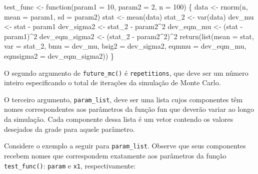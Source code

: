 \documentclass[
  letterpaper,
  DIV=11,
  numbers=noendperiod]{scrreprt}
\newenvironment{Shaded}{\begin{snugshade}}{\end{snugshade}}
\newcommand{\AttributeTok}[1]{\textcolor[rgb]{0.40,0.45,0.13}{#1}}
\newcommand{\ControlFlowTok}[1]{\textcolor[rgb]{0.00,0.23,0.31}{#1}}
\newcommand{\DecValTok}[1]{\textcolor[rgb]{0.68,0.00,0.00}{#1}}
\newcommand{\FunctionTok}[1]{\textcolor[rgb]{0.28,0.35,0.67}{#1}}
\newcommand{\NormalTok}[1]{\textcolor[rgb]{0.00,0.23,0.31}{#1}}
\newcommand{\OtherTok}[1]{\textcolor[rgb]{0.00,0.23,0.31}{#1}}
\newcommand{\SpecialCharTok}[1]{\textcolor[rgb]{0.37,0.37,0.37}{#1}}
\begin{document}
\begin{Shaded}
\begin{Highlighting}[]
\NormalTok{test\_func }\OtherTok{\textless{}{-}} \ControlFlowTok{function}\NormalTok{(}\AttributeTok{param1 =} \DecValTok{10}\NormalTok{, }\AttributeTok{param2 =} \DecValTok{2}\NormalTok{, }\AttributeTok{n =} \DecValTok{100}\NormalTok{) \{}
\NormalTok{  data }\OtherTok{\textless{}{-}} \FunctionTok{rnorm}\NormalTok{(n, }\AttributeTok{mean =}\NormalTok{ param1, }\AttributeTok{sd =}\NormalTok{ param2)}
\NormalTok{  stat }\OtherTok{\textless{}{-}} \FunctionTok{mean}\NormalTok{(data)}
\NormalTok{  stat\_2 }\OtherTok{\textless{}{-}} \FunctionTok{var}\NormalTok{(data)}
\NormalTok{  dev\_mu }\OtherTok{\textless{}{-}}\NormalTok{ stat }\SpecialCharTok{{-}}\NormalTok{ param1}
\NormalTok{  dev\_sigma2 }\OtherTok{\textless{}{-}}\NormalTok{ stat\_2 }\SpecialCharTok{{-}}\NormalTok{ param2}\SpecialCharTok{\^{}}\DecValTok{2}
\NormalTok{  dev\_eqm\_mu }\OtherTok{\textless{}{-}}\NormalTok{ (stat }\SpecialCharTok{{-}}\NormalTok{ param1)}\SpecialCharTok{\^{}}\DecValTok{2}
\NormalTok{  dev\_eqm\_sigma2 }\OtherTok{\textless{}{-}}\NormalTok{ (stat\_2 }\SpecialCharTok{{-}}\NormalTok{ param2}\SpecialCharTok{\^{}}\DecValTok{2}\NormalTok{)}\SpecialCharTok{\^{}}\DecValTok{2}
  \FunctionTok{return}\NormalTok{(}\FunctionTok{list}\NormalTok{(}\AttributeTok{mean =}\NormalTok{ stat, }\AttributeTok{var =}\NormalTok{ stat\_2, }\AttributeTok{bmu =}\NormalTok{ dev\_mu, }\AttributeTok{bsig2 =}\NormalTok{ dev\_sigma2, }
         \AttributeTok{eqmmu =}\NormalTok{ dev\_eqm\_mu, }
         \AttributeTok{eqmsigma2 =}\NormalTok{ dev\_eqm\_sigma2))}
\NormalTok{\}}
\end{Highlighting}
\end{Shaded}

O segundo argumento de \texttt{future\_mc()} é \texttt{repetitions}, que
deve ser um número inteiro especificando o total de iterações da
simulação de Monte Carlo.

O terceiro argumento, \texttt{param\_list}, deve ser uma lista cujos
componentes têm nomes correspondentes aos parâmetros da função fun que
deverão variar ao longo da simulação. Cada componente dessa lista é um
vetor contendo os valores desejados da grade para aquele parâmetro.

Considere o exemplo a seguir para \texttt{param\_list}. Observe que seus
componentes recebem nomes que correspondem exatamente aos parâmetros da
função \texttt{test\_func()}: \texttt{param} e \texttt{x1},
respectivamente:
\end{document}
